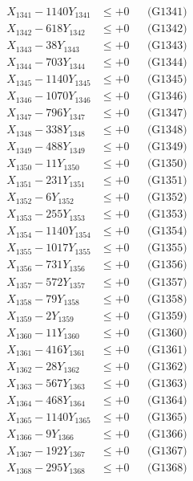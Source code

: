 \documentclass[a4paper,10pt]{article}
\begin{document}
{\begin{align}
\allowbreak
X_{1341} - 1140Y_{1341} &\leq +0 && \text{(G1341)} \\
X_{1342} - 618Y_{1342} &\leq +0 && \text{(G1342)} \\
X_{1343} - 38Y_{1343} &\leq +0 && \text{(G1343)} \\
X_{1344} - 703Y_{1344} &\leq +0 && \text{(G1344)} \\
X_{1345} - 1140Y_{1345} &\leq +0 && \text{(G1345)} \\
X_{1346} - 1070Y_{1346} &\leq +0 && \text{(G1346)} \\
X_{1347} - 796Y_{1347} &\leq +0 && \text{(G1347)} \\
X_{1348} - 338Y_{1348} &\leq +0 && \text{(G1348)} \\
X_{1349} - 488Y_{1349} &\leq +0 && \text{(G1349)} \\
X_{1350} - 11Y_{1350} &\leq +0 && \text{(G1350)} \\
\allowbreak
X_{1351} - 231Y_{1351} &\leq +0 && \text{(G1351)} \\
X_{1352} - 6Y_{1352} &\leq +0 && \text{(G1352)} \\
X_{1353} - 255Y_{1353} &\leq +0 && \text{(G1353)} \\
X_{1354} - 1140Y_{1354} &\leq +0 && \text{(G1354)} \\
X_{1355} - 1017Y_{1355} &\leq +0 && \text{(G1355)} \\
X_{1356} - 731Y_{1356} &\leq +0 && \text{(G1356)} \\
X_{1357} - 572Y_{1357} &\leq +0 && \text{(G1357)} \\
X_{1358} - 79Y_{1358} &\leq +0 && \text{(G1358)} \\
X_{1359} - 2Y_{1359} &\leq +0 && \text{(G1359)} \\
X_{1360} - 11Y_{1360} &\leq +0 && \text{(G1360)} \\
\allowbreak
X_{1361} - 416Y_{1361} &\leq +0 && \text{(G1361)} \\
X_{1362} - 28Y_{1362} &\leq +0 && \text{(G1362)} \\
X_{1363} - 567Y_{1363} &\leq +0 && \text{(G1363)} \\
X_{1364} - 468Y_{1364} &\leq +0 && \text{(G1364)} \\
X_{1365} - 1140Y_{1365} &\leq +0 && \text{(G1365)} \\
X_{1366} - 9Y_{1366} &\leq +0 && \text{(G1366)} \\
X_{1367} - 192Y_{1367} &\leq +0 && \text{(G1367)} \\
X_{1368} - 295Y_{1368} &\leq +0 && \text{(G1368)} \\

\end{align}}
\end{document}
